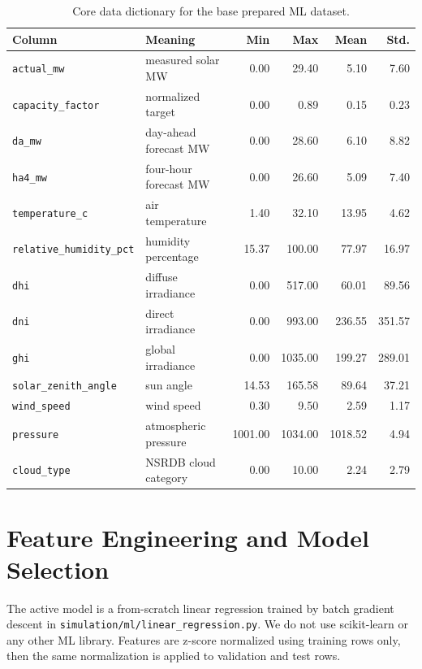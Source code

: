 \documentclass[paper=a4, fontsize=11pt]{scrartcl}
\begin{document}
\begin{table}[h]
\centering
\small
\begin{tabular}{llrrrr}
\toprule
\textbf{Column} & \textbf{Meaning} & \textbf{Min} & \textbf{Max} & \textbf{Mean} & \textbf{Std.} \\
\midrule
\texttt{actual\_mw} & measured solar MW & 0.00 & 29.40 & 5.10 & 7.60 \\
\texttt{capacity\_factor} & normalized target & 0.00 & 0.89 & 0.15 & 0.23 \\
\texttt{da\_mw} & day-ahead forecast MW & 0.00 & 28.60 & 6.10 & 8.82 \\
\texttt{ha4\_mw} & four-hour forecast MW & 0.00 & 26.60 & 5.09 & 7.40 \\
\texttt{temperature\_c} & air temperature & 1.40 & 32.10 & 13.95 & 4.62 \\
\texttt{relative\_humidity\_pct} & humidity percentage & 15.37 & 100.00 & 77.97 & 16.97 \\
\texttt{dhi} & diffuse irradiance & 0.00 & 517.00 & 60.01 & 89.56 \\
\texttt{dni} & direct irradiance & 0.00 & 993.00 & 236.55 & 351.57 \\
\texttt{ghi} & global irradiance & 0.00 & 1035.00 & 199.27 & 289.01 \\
\texttt{solar\_zenith\_angle} & sun angle & 14.53 & 165.58 & 89.64 & 37.21 \\
\texttt{wind\_speed} & wind speed & 0.30 & 9.50 & 2.59 & 1.17 \\
\texttt{pressure} & atmospheric pressure & 1001.00 & 1034.00 & 1018.52 & 4.94 \\
\texttt{cloud\_type} & NSRDB cloud category & 0.00 & 10.00 & 2.24 & 2.79 \\
\bottomrule
\end{tabular}
\caption{Core data dictionary for the base prepared ML dataset.}
\end{table}

\section{Feature Engineering and Model Selection}

The active model is a from-scratch linear regression trained by batch gradient
descent in \texttt{simulation/ml/linear\_regression.py}. We do not use
scikit-learn or any other ML library. Features are z-score normalized using
training rows only, then the same normalization is applied to validation and
test rows.
\end{document}
